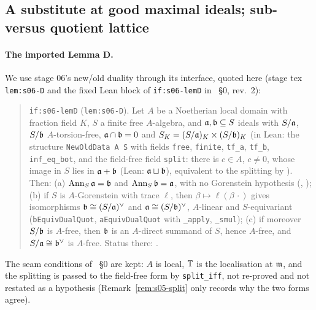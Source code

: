 \subsection{A substitute at good maximal ideals; sub- versus quotient lattice}\label{ss:s05-subquot}

\paragraph{The imported Lemma D.} We use stage 06's new/old duality through its interface, quoted here (stage tex \texttt{lem:s06-D}
and the fixed Lean block of \texttt{if:s06-lemD} in ~\S0, rev.~2):
\begin{quote}\small
\texttt{if:s06-lemD} (\texttt{lem:s06-D}). Let $A$ be a Noetherian local domain with fraction field $K$, $S$ a finite free $A$-algebra, and
$\mathfrak{a},\mathfrak{b}\subseteq S$ ideals with $S/\mathfrak{a}$, $S/\mathfrak{b}$ $A$-torsion-free, $\mathfrak{a}\cap\mathfrak{b}=0$ and $S_K=(S/\mathfrak{a})_K\times(S/\mathfrak{b})_K$ (in Lean: the
structure \texttt{NewOldData A S} with fields \texttt{free}, \texttt{finite}, \texttt{tf\_a}, \texttt{tf\_b}, \texttt{inf\_eq\_bot}, and the
field-free field \texttt{split}: there is $c\in A$, $c\ne0$, whose image in $S$ lies in $\mathfrak{a}+\mathfrak{b}$ (Lean: $\mathfrak{a}\sqcup\mathfrak{b}$), equivalent to the splitting by ). Then:
(a) $\operatorname{Ann}_S\mathfrak{a}=\mathfrak{b}$ and $\operatorname{Ann}_S\mathfrak{b}=\mathfrak{a}$, with no Gorenstein hypothesis (, );
(b) if $S$ is $A$-Gorenstein with trace $\ell$, then $\beta\mapsto\ell(\beta\,\cdot)$ gives isomorphisms $\mathfrak{b}\cong(S/\mathfrak{a})^\vee$ and
$\mathfrak{a}\cong(S/\mathfrak{b})^\vee$, $A$-linear and $S$-equivariant (\texttt{bEquivDualQuot}, \texttt{aEquivDualQuot} with \texttt{\_apply}, \texttt{\_smul});
(c) if moreover $S/\mathfrak{b}$ is $A$-free, then $\mathfrak{b}$ is an $A$-direct summand of $S$, hence $A$-free, and $S/\mathfrak{a}\cong\mathfrak{b}^\vee$ is $A$-free.
Status there: \stproved.
\end{quote}
The seam conditions of ~\S0 are kept: $A$ is local, $\mathbb{T}$ is the localisation at $\mathfrak{m}$, and the splitting is passed to the
field-free form by \texttt{split\_iff}, not re-proved and not restated as a hypothesis (Remark~\ref{rem:s05-split} only records why the two
forms agree).


